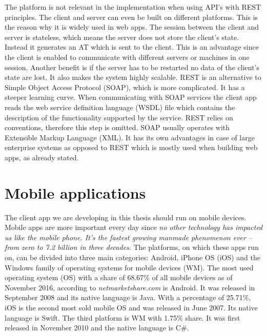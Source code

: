 The platform is not relevant in the implementation when using API's with REST principles. The client and server can even be built on different platforms. This is the reason why it is widely used in web apps. The session between the client and server is stateless, which means the server does not store the client's state. Instead it generates an AT which is sent to the client. This is an advantage since the client is enabled to communicate with different servers or machines in one session. Another benefit is if the server has to be restarted no data of the client's state are lost. It also makes the system highly scalable. REST is an alternative to Simple Object Access Protocol (SOAP), which is more complicated. It has a steeper learning curve. When communicating with SOAP services the client app reads the web service definition language (WSDL) file which contains the description of the functionality supported by the service. REST relies on conventions, therefore this step is omitted. SOAP usually operates with Extensible Markup Language (XML). It has its own advantages in case of large enterprise systems as opposed to REST which is mostly used when building web apps, as already stated.

\section{Mobile applications} \label{analysisMobileApplications}
The client app we are developing in this thesis should run on mobile devices. Mobile apps are more important every day since \textit{no other technology has impacted us like the mobile phone. It's the fastest growing manmade phenomenon ever -- from zero to 7.2 billion in three decades}\cite{more-gadgets-on-earth-than-people}. The platforms, on which these apps run on, can be divided into three main categories: Android, iPhone OS (iOS) and the Windows family of operating systems for mobile devices (WM). The most used operating system (OS) with a share of 68.67\% of all mobile devices as of November 2016, according to \textit{netmarketshare.com} \cite{operating-system-market-share} is Android. It was  released in September 2008 and its native language is Java. With a percentage of 25.71\%, iOS is the second most sold mobile OS and was released in June 2007. Its native language is Swift. The third platform is WM with 1.75\% share. It was first released in November 2010 and the native language is C\#. 

